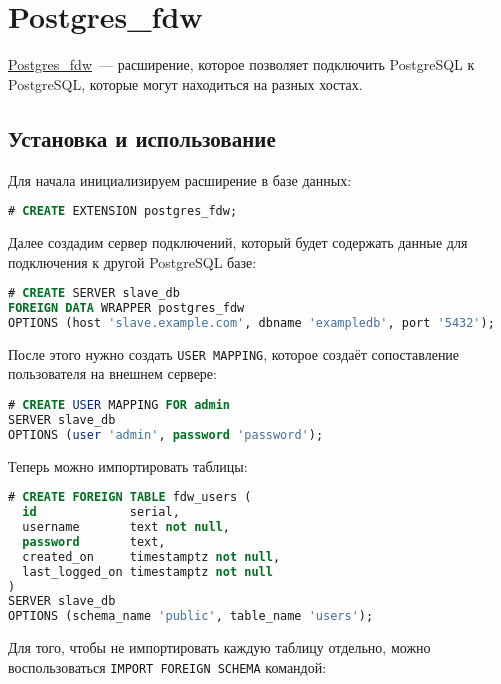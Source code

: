 \section{Postgres\_fdw}

\href{https://www.postgresql.org/docs/current/static/postgres-fdw.html}{Postgres\_fdw}~--- расширение, которое позволяет подключить PostgreSQL к PostgreSQL, которые могут находиться на разных хостах.

\subsection{Установка и использование}

Для начала инициализируем расширение в базе данных:

\begin{lstlisting}[language=SQL,label=lst:postgresfdw1,caption=Инициализация postgres\_fdw]
# CREATE EXTENSION postgres_fdw;
\end{lstlisting}

Далее создадим сервер подключений, который будет содержать данные для подключения к другой PostgreSQL базе:

\begin{lstlisting}[language=SQL,label=lst:postgresfdw2,caption=Создание сервера]
# CREATE SERVER slave_db
FOREIGN DATA WRAPPER postgres_fdw
OPTIONS (host 'slave.example.com', dbname 'exampledb', port '5432');
\end{lstlisting}

После этого нужно создать \lstinline!USER MAPPING!, которое создаёт сопоставление пользователя на внешнем сервере:

\begin{lstlisting}[language=SQL,label=lst:postgresfdw3,caption=USER MAPPING]
# CREATE USER MAPPING FOR admin
SERVER slave_db
OPTIONS (user 'admin', password 'password');
\end{lstlisting}

Теперь можно импортировать таблицы:

\begin{lstlisting}[language=SQL,label=lst:postgresfdw4,caption=Импорт таблицы]
# CREATE FOREIGN TABLE fdw_users (
  id             serial,
  username       text not null,
  password       text,
  created_on     timestamptz not null,
  last_logged_on timestamptz not null
)
SERVER slave_db
OPTIONS (schema_name 'public', table_name 'users');
\end{lstlisting}

Для того, чтобы не импортировать каждую таблицу отдельно, можно воспользоваться \lstinline!IMPORT FOREIGN SCHEMA! командой:


